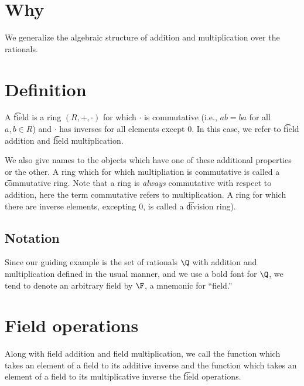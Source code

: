 

\section*{Why}

We generalize the algebraic structure of addition and multiplication over the rationals.

\section*{Definition}

A \t{field} is a ring $(R, +, \cdot  )$ for which $\cdot  $ is commutative (i.e., $ab = ba$ for all $a, b \in R$) and $\cdot  $ has inverses for all elements except $0$.
In this case, we refer to \t{field addition} and \t{field multiplication}.

We also give names to the objects which have one of these additional properties or the other.
A ring which for which multipliation is commutative is called a \t{commutative ring}.
Note that a ring is \textit{always} commutative with respect to addition, here the term commutative refers to multiplication.
A ring for which there are inverse elements, excepting 0, is called a \t{division ring}).

\subsection*{Notation}

Since our guiding example is the set of rationals $\Q  $ with addition and multiplication defined in the usual manner, and we use a bold font for $\Q  $, we tend to denote an arbitrary field by $\F  $, a mnemonic for ``field.''

\section*{Field operations}

Along with field addition and field multiplication, we call the function which takes an element of a field to its additive inverse and the function which takes an element of a field to its multiplicative inverse the \t{field operations}.
\blankpage
